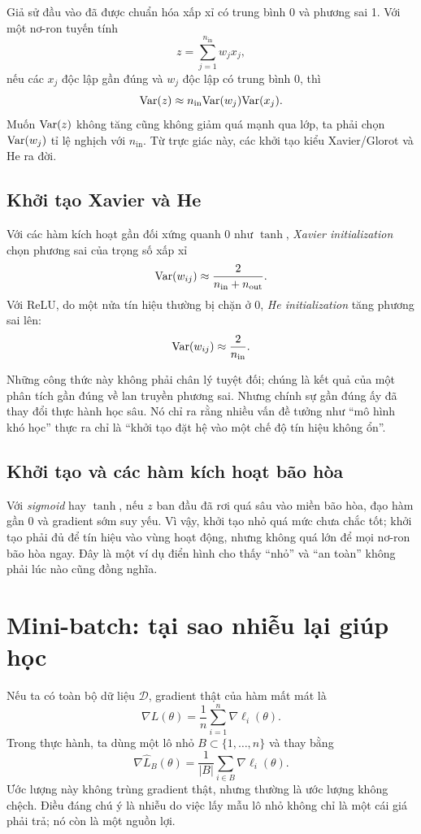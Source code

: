 Giả sử đầu vào đã được chuẩn hóa xấp xỉ có trung bình 0 và phương sai 1. Với một nơ-ron tuyến tính
\[
z=\sum_{j=1}^{n_{\mathrm{in}}} w_j x_j,
\]
nếu các \(x_j\) độc lập gần đúng và \(w_j\) độc lập có trung bình 0, thì
\[
\mathrm{Var}(z)\approx n_{\mathrm{in}} \mathrm{Var}(w_j)\mathrm{Var}(x_j).
\]
Muốn \(\mathrm{Var}(z)\) không tăng cũng không giảm quá mạnh qua lớp, ta phải chọn \(\mathrm{Var}(w_j)\) tỉ lệ nghịch với \(n_{\mathrm{in}}\). Từ trực giác này, các khởi tạo kiểu Xavier/Glorot và He ra đời.

\subsection{Khởi tạo Xavier và He}

Với các hàm kích hoạt gần đối xứng quanh 0 như \(\tanh\), \emph{Xavier initialization} chọn phương sai của trọng số xấp xỉ
\[
\mathrm{Var}(w_{ij})\approx \frac{2}{n_{\mathrm{in}}+n_{\mathrm{out}}}.
\]
Với ReLU, do một nửa tín hiệu thường bị chặn ở 0, \emph{He initialization} tăng phương sai lên:
\[
\mathrm{Var}(w_{ij})\approx \frac{2}{n_{\mathrm{in}}}.
\]

Những công thức này không phải chân lý tuyệt đối; chúng là kết quả của một phân tích gần đúng về lan truyền phương sai. Nhưng chính sự gần đúng ấy đã thay đổi thực hành học sâu. Nó chỉ ra rằng nhiều vấn đề tưởng như ``mô hình khó học'' thực ra chỉ là ``khởi tạo đặt hệ vào một chế độ tín hiệu không ổn''.

\subsection{Khởi tạo và các hàm kích hoạt bão hòa}

Với \emph{sigmoid} hay \(\tanh\), nếu \(z\) ban đầu đã rơi quá sâu vào miền bão hòa, đạo hàm gần 0 và gradient sớm suy yếu. Vì vậy, khởi tạo nhỏ quá mức chưa chắc tốt; khởi tạo phải đủ để tín hiệu vào vùng hoạt động, nhưng không quá lớn để mọi nơ-ron bão hòa ngay. Đây là một ví dụ điển hình cho thấy ``nhỏ'' và ``an toàn'' không phải lúc nào cũng đồng nghĩa.

\section{Mini-batch: tại sao nhiễu lại giúp học}

Nếu ta có toàn bộ dữ liệu \(\mathcal{D}\), gradient thật của hàm mất mát là
\[
\nabla L(\theta)=\frac{1}{n}\sum_{i=1}^n \nabla \ell_i(\theta).
\]
Trong thực hành, ta dùng một lô nhỏ \(B\subset\{1,\dots,n\}\) và thay bằng
\[
\nabla \widehat{L}_B(\theta)=\frac{1}{|B|}\sum_{i\in B}\nabla \ell_i(\theta).
\]
Ước lượng này không trùng gradient thật, nhưng thường là ước lượng không chệch. Điều đáng chú ý là nhiễu do việc lấy mẫu lô nhỏ không chỉ là một cái giá phải trả; nó còn là một nguồn lợi.

